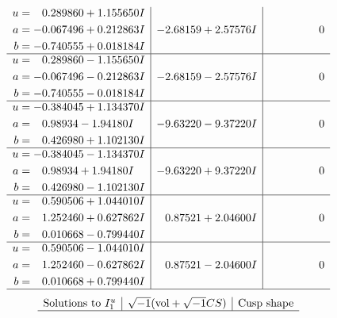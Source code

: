 \documentclass[1p]{elsarticle_modified}
\theoremstyle{definition}
\newcommand{\I}{\sqrt{-1}}
\begin{document}
$$\begin{array}{c|c|c}
\begin{aligned}
u &= \phantom{-}0.289860 + 1.155650 I \\
a &= -0.067496 + 0.212863 I \\
b &= -0.740555 + 0.018184 I\end{aligned}
 & -2.68159 + 2.57576 I & \phantom{-0.000000 } 0 \\ \hline\begin{aligned}
u &= \phantom{-}0.289860 - 1.155650 I \\
a &= -0.067496 - 0.212863 I \\
b &= -0.740555 - 0.018184 I\end{aligned}
 & -2.68159 - 2.57576 I & \phantom{-0.000000 } 0 \\ \hline\begin{aligned}
u &= -0.384045 + 1.134370 I \\
a &= \phantom{-}0.98934 - 1.94180 I \\
b &= \phantom{-}0.426980 + 1.102130 I\end{aligned}
 & -9.63220 - 9.37220 I & \phantom{-0.000000 } 0 \\ \hline\begin{aligned}
u &= -0.384045 - 1.134370 I \\
a &= \phantom{-}0.98934 + 1.94180 I \\
b &= \phantom{-}0.426980 - 1.102130 I\end{aligned}
 & -9.63220 + 9.37220 I & \phantom{-0.000000 } 0 \\ \hline\begin{aligned}
u &= \phantom{-}0.590506 + 1.044010 I \\
a &= \phantom{-}1.252460 + 0.627862 I \\
b &= \phantom{-}0.010668 - 0.799440 I\end{aligned}
 & \phantom{-}0.87521 + 2.04600 I & \phantom{-0.000000 } 0 \\ \hline\begin{aligned}
u &= \phantom{-}0.590506 - 1.044010 I \\
a &= \phantom{-}1.252460 - 0.627862 I \\
b &= \phantom{-}0.010668 + 0.799440 I\end{aligned}
 & \phantom{-}0.87521 - 2.04600 I & \phantom{-0.000000 } 0\\
 \hline 
 \end{array}$$\newpage$$\begin{array}{c|c|c}  
\text{Solutions to }I^u_{1}& \I (\text{vol} + \sqrt{-1}CS) & \text{Cusp shape}\\
 \hline 

\end{array}$$
\end{document}
